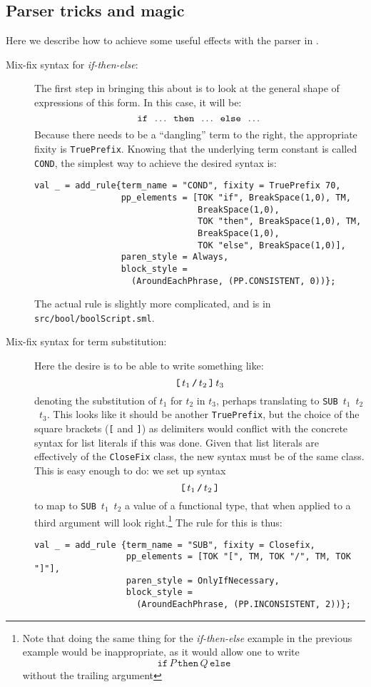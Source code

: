 {\subsection{Parser tricks and magic}

Here we describe how to achieve some useful effects with the
parser in \HOL{}.

\begin{description}
\item [Mix-fix syntax for {\it if-then-else}:] The first step in
  bringing this about is to look at the general shape of expressions
  of this form.  In this case, it will be:
  \[
  \mbox{\tt if}\;\; \dots \;\;\mbox{\tt then}\;\;\dots\;\;
  \mbox{\tt else}\;\;\dots
  \]
  Because there needs to be a ``dangling'' term to the right, the
  appropriate fixity is \texttt{TruePrefix}.  Knowing that the
  underlying term constant is called \texttt{COND}, the simplest way
  to achieve the desired syntax is:
  \begin{verbatim}
val _ = add_rule{term_name = "COND", fixity = TruePrefix 70,
                 pp_elements = [TOK "if", BreakSpace(1,0), TM,
                                BreakSpace(1,0),
                                TOK "then", BreakSpace(1,0), TM,
                                BreakSpace(1,0),
                                TOK "else", BreakSpace(1,0)],
                 paren_style = Always,
                 block_style =
                   (AroundEachPhrase, (PP.CONSISTENT, 0))};
\end{verbatim}
  \noindent The actual rule is slightly more complicated, and is
  in \texttt{src/bool/boolScript.sml}.


\item[Mix-fix syntax for term substitution:] Here the desire is to be able
  to write something like:
  \[
  \mbox{\texttt{[}}\,t_1\,\mbox{\texttt{/}}\,t_2\,\mbox{\texttt{]}}\,t_3
  \]
  denoting the substitution of $t_1$ for $t_2$ in $t_3$, perhaps
  translating to \mbox{\texttt{SUB} $t_1$ $t_2$ $t_3$}.  This looks
like it should be another \texttt{TruePrefix}, but the choice of the
square brackets (\texttt{[} and \texttt{]}) as delimiters would
conflict with the concrete syntax for list literals if this was done.
Given that list literals are effectively of the \texttt{CloseFix}
class, the new syntax must be of the same class.  This is easy enough
to do: we set up syntax \[
\mbox{\texttt{[}}\,t_1\,\mbox{\texttt{/}}\,t_2\,\mbox{\texttt{]}}
  \] to map to \mbox{\texttt{SUB} $t_1$ $t_2$} a value of a functional
  type, that when applied to a third argument will look
  right.\footnote{Note that doing the same thing for the
    \textit{if-then-else} example in the previous example would be
    inappropriate, as it would allow one to write \[
    \texttt{if}\,P\,\texttt{then}\,Q\,\texttt{else}
    \] without the trailing argument}
  The rule for this is thus:
  \begin{verbatim}
val _ = add_rule {term_name = "SUB", fixity = Closefix,
                  pp_elements = [TOK "[", TM, TOK "/", TM, TOK "]"],
                  paren_style = OnlyIfNecessary,
                  block_style =
                    (AroundEachPhrase, (PP.INCONSISTENT, 2))};
\end{verbatim}


\end{description}}
